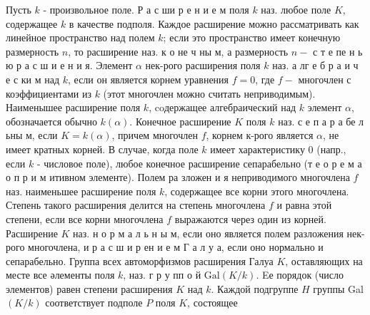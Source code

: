 \documentclass[10pt]{article}
\begin{document}
Пусть $k$ - произвольное поле. Р а с ши р е н и е м поля $k$ наз. любое поле $K$, содержащее $k$ в качестве подполя. Каждое расширение можно рассматривать как линейное пространство над полем $k$; если это пространство имеет конечную размерность $n$, то расширение наз. к о не ч ны м, а размерность $n-$ с т е пе н ь ю р а с ш и е н и я. Элемент $\alpha$ нек-рого расширения поля $k$ наз. а лг е б р а и ч е с ки м над $k$, если он является корнем уравнения $f=0$, где $f-$ многочлен с коэффициентами из $k$ (этот многочлен можно считать неприводимым). Наименышее расширение поля $k$, coдержащее алгебраический над $k$ элемент $\alpha$, обозначается обычно $k(\alpha)$. Конечное расширение $K$ поля $k$ наз. с е п а р а бе л ьны м, если $K=k(\alpha)$, причем многочлен $f$, корнем к-рого является $\alpha$, не имеет кратных корней. В случае, когда поле $k$ имеет характеристику 0 (напр., если $k$ - числовое поле), любое конечное расширение сепарабельно (т е о р е м а $о$ п р и м итивном элементе). Полем ра зложен и я неприводимого многочлена $f$ наз. наименьшее расширение поля $k$, содержащее все корни этого многочлена. Степень такого расширения делится на степень многочлена $f$ и равна этой степени, если все корни многочлена $f$ выражаются через один из корней. Расширение $K$ наз. н о р м а л ь н ы м, если оно является полем разложения нек-рого многочлена, и р а с ш и р ен и е м Г а л у а, если оно нормально и сепарабельно. Группа всех автоморфизмов расширения Галуа $K$, оставляющих на месте все әлементы поля $k$, наз. г р у пп о й $\mathrm{Gal}(K / k)$. Eе порядок (число элементов) равен степени расширения $K$ над $k$. Каждой подгруппе $H$ группы Gal $(K / k)$ соответствует подполе $P$ поля $K$, состоящее
\end{document}
